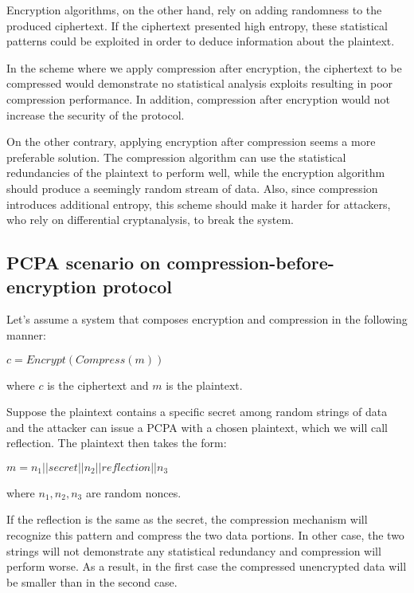 Encryption algorithms, on the other hand, rely on adding randomness to the
produced ciphertext. If the ciphertext presented high entropy, these statistical
patterns could be exploited in order to deduce information about the plaintext.

In the scheme where we apply compression after encryption, the ciphertext to be
compressed would demonstrate no statistical analysis exploits resulting in
poor compression performance. In addition, compression after encryption would
not increase the security of the protocol.

On the other contrary, applying encryption after compression seems a more
preferable solution. The compression algorithm can use the statistical
redundancies of the plaintext to perform well, while the encryption algorithm
should produce a seemingly random stream of data. Also, since compression
introduces additional entropy, this scheme should make it harder for attackers,
who rely on differential cryptanalysis, to break the system.

\subsection{PCPA scenario on compression-before-encryption protocol}

Let's assume a system that composes encryption and compression in the following
manner:

\begin{math}c = Encrypt(Compress(m))\end{math}

where \begin{math}c\end{math} is the ciphertext and \begin{math}m\end{math} is
the plaintext.

Suppose the plaintext contains a specific secret among random strings of data
and the attacker can issue a PCPA with a chosen plaintext, which we will call
reflection. The plaintext then takes the form:

\begin{math}m = n_1 || secret || n_2 || reflection || n_3\end{math}

where \begin{math}n_1, n_2, n_3\end{math} are random nonces.

If the reflection is the same as the secret, the compression mechanism will
recognize this pattern and compress the two data portions. In other case, the
two strings will not demonstrate any statistical redundancy and compression will
perform worse. As a result, in the first case the compressed unencrypted data
will be smaller than in the second case.


